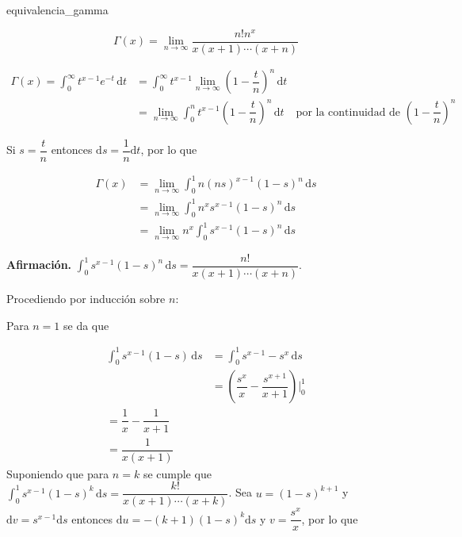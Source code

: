 \documentclass[fleqn]{article}
\newenvironment{lema}[2]{\begin{lem}[breakable, pad at break = 5mm, leftrule = 0.7mm, rightrule = 0.7mm, right = 2mm, left = 2mm, enlarge bottom finally by = 3mm, fontupper = \setlength{\parskip}{2mm}, fontlower = \setlength{\parskip}{2mm}]{#1}{#2}}{\end{lem}}
\newcommand{\intg}[4]{\int_{#1}^{#2} \!\! #3 \, \mathrm{d} #4}
\begin{document}
	\begin{lema}{}{equivalencia_gamma}
		\vspace{3mm}

		\begin{equation*}
			\Gamma (x) = \lim_{n \to \infty} \dfrac{n! n^x}{x(x+1) \cdots (x+n)}
		\end{equation*}

		\tcblower

		\vspace{3mm}
		
		\begin{align*}
			\Gamma (x) = \intg{0}{\infty}{t^{x-1} e^{-t}}{t} &= \intg{0}{\infty}{t^{x-1} \lim_{n \to \infty} \left( 1 - \dfrac{t}{n} \right)^n}{t} \\
			&= \lim_{n \to \infty} \intg{0}{n}{t^{x-1} \left( 1 - \dfrac{t}{n} \right)^n}{t} & \mbox{por la continuidad de } \left( 1 - \dfrac{t}{n} \right)^n
		\end{align*}

		Si $ s = \dfrac{t}{n} $ entonces $ \mathrm{d}s = \dfrac{1}{n} \mathrm{d} t $, por lo que

		\begin{align*}
			\Gamma (x) &= \lim_{n \to \infty} \intg{0}{1}{n (ns)^{x-1} (1 - s)^n}{s} \\
			&= \lim_{n \to \infty} \intg{0}{1}{n^x s^{x-1} (1 - s)^n}{s} \\
			&= \lim_{n \to \infty} n^x \intg{0}{1}{s^{x-1} (1 - s)^n}{s}
		\end{align*}

		\textbf{Afirmación.} $ \displaystyle \intg{0}{1}{s^{x-1} (1 - s)^n}{s} = \dfrac{n!}{x(x + 1) \cdots (x + n)} $.

		\hfill \begin{minipage}{0.99\linewidth}
			\setlength{\parskip}{2mm}

			Procediendo por inducción sobre $ n $:

			Para $ n = 1 $ se da que 
			
			\begin{align*}
				\intg{0}{1}{s^{x-1} (1 - s)}{s} &= \intg{0}{1}{s^{x-1} - s^x}{s} \\
				&= \left( \dfrac{s^x}{x} - \dfrac{s^{x+1}}{x+1} \right) \Big|_0^1 \\
				= \dfrac{1}{x} - \dfrac{1}{x+1} \\
				= \dfrac{1}{x(x+1)}
			\end{align*}
			Suponiendo que para $ n = k $ se cumple que $ \displaystyle \intg{0}{1}{s^{x-1} (1 - s)^k}{s} = \dfrac{k!}{x(x + 1) \cdots (x + k)} $. Sea $ u = (1 - s)^{k+1} $ y $ \mathrm{d} v = s^{x-1} \mathrm{d} s $ entonces $ \mathrm{d} u = -(k+1) (1-s)^k \mathrm{d} s $ y $ v = \dfrac{s^x}{x} $, por lo que
		\end{minipage}


\end{lema}
\end{document}
